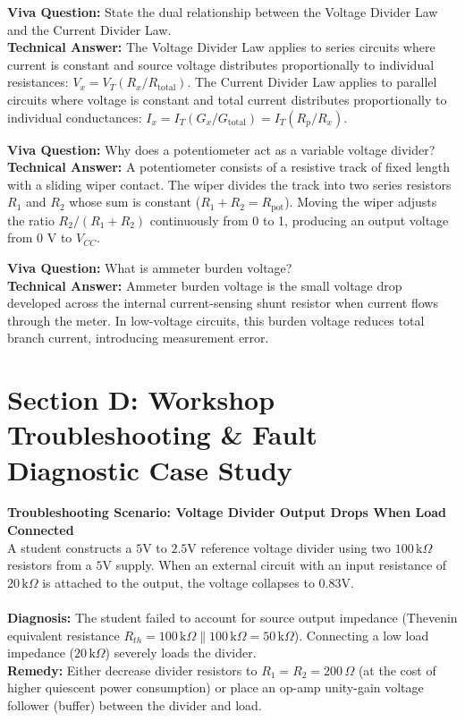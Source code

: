\noindent\textbf{Viva Question:} State the dual relationship between the Voltage Divider Law and the Current Divider Law.\\
\textbf{Technical Answer:} The Voltage Divider Law applies to series circuits where current is constant and source voltage distributes proportionally to individual resistances: $V_x = V_T (R_x / R_{\mathrm{total}})$. The Current Divider Law applies to parallel circuits where voltage is constant and total current distributes proportionally to individual conductances: $I_x = I_T (G_x / G_{\mathrm{total}}) = I_T (R_p / R_x)$.
\vspace{3mm}

\noindent\textbf{Viva Question:} Why does a potentiometer act as a variable voltage divider?\\
\textbf{Technical Answer:} A potentiometer consists of a resistive track of fixed length with a sliding wiper contact. The wiper divides the track into two series resistors $R_1$ and $R_2$ whose sum is constant ($R_1 + R_2 = R_{\mathrm{pot}}$). Moving the wiper adjusts the ratio $R_2 / (R_1 + R_2)$ continuously from 0 to 1, producing an output voltage from $0\text{ V}$ to $V_{CC}$.
\vspace{3mm}

\noindent\textbf{Viva Question:} What is ammeter burden voltage?\\
\textbf{Technical Answer:} Ammeter burden voltage is the small voltage drop developed across the internal current-sensing shunt resistor when current flows through the meter. In low-voltage circuits, this burden voltage reduces total branch current, introducing measurement error.
\vspace{3mm}


\section{Section D: Workshop Troubleshooting \& Fault Diagnostic Case Study}

\textbf{Troubleshooting Scenario: Voltage Divider Output Drops When Load Connected}\\
A student constructs a $5\text{V}$ to $2.5\text{V}$ reference voltage divider using two $100\,\mathrm{k}\Omega$ resistors from a $5\text{V}$ supply. When an external circuit with an input resistance of $20\,\mathrm{k}\Omega$ is attached to the output, the voltage collapses to $0.83\text{V}$.\\\\
\textbf{Diagnosis:} The student failed to account for source output impedance (Thevenin equivalent resistance $R_{th} = 100\,\mathrm{k}\Omega \parallel 100\,\mathrm{k}\Omega = 50\,\mathrm{k}\Omega$). Connecting a low load impedance ($20\,\mathrm{k}\Omega$) severely loads the divider.\\
\textbf{Remedy:} Either decrease divider resistors to $R_1 = R_2 = 200\,\Omega$ (at the cost of higher quiescent power consumption) or place an op-amp unity-gain voltage follower (buffer) between the divider and load.
\vspace{4mm}
